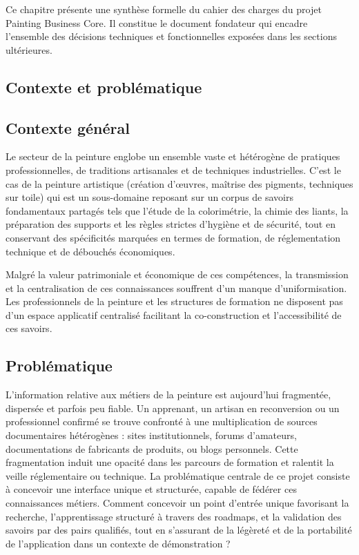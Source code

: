 \documentclass[12pt,a4paper]{report}
\begin{document}
Ce chapitre présente une synthèse formelle du cahier des charges du projet Painting Business Core. Il constitue le document fondateur qui encadre l'ensemble des décisions techniques et fonctionnelles exposées dans les sections ultérieures.

\subsection{Contexte et problématique}
\subsection*{Contexte général}

Le secteur de la peinture englobe un ensemble vaste et hétérogène de pratiques professionnelles, de traditions artisanales et de techniques industrielles. C'est le cas de la peinture artistique (création d'œuvres, maîtrise des pigments, techniques sur toile) qui est un sous-domaine reposant sur un corpus de savoirs fondamentaux partagés tels que l'étude de la colorimétrie, la chimie des liants, la préparation des supports et les règles strictes d'hygiène et de sécurité, tout en conservant des spécificités marquées en termes de formation, de réglementation technique et de débouchés économiques.

Malgré la valeur patrimoniale et économique de ces compétences, la transmission et la centralisation de ces connaissances souffrent d'un manque d'uniformisation. Les professionnels de la peinture et les structures de formation ne disposent pas d'un espace applicatif centralisé facilitant la co-construction et l'accessibilité de ces savoirs.

\subsection*{Problématique}

L'information relative aux métiers de la peinture est aujourd'hui fragmentée, dispersée et parfois peu fiable. Un apprenant, un artisan en reconversion ou un professionnel confirmé se trouve confronté à une multiplication de sources documentaires hétérogènes : sites institutionnels, forums d'amateurs, documentations de fabricants de produits, ou blogs personnels. Cette fragmentation induit une opacité dans les parcours de formation et ralentit la veille réglementaire ou technique. La problématique centrale de ce projet consiste à concevoir une interface unique et structurée, capable de fédérer ces connaissances métiers. Comment concevoir un point d'entrée unique favorisant la recherche, l'apprentissage structuré à travers des roadmaps, et la validation des savoirs par des pairs qualifiés, tout en s'assurant de la légèreté et de la portabilité de l'application dans un contexte de démonstration ?
\end{document}
